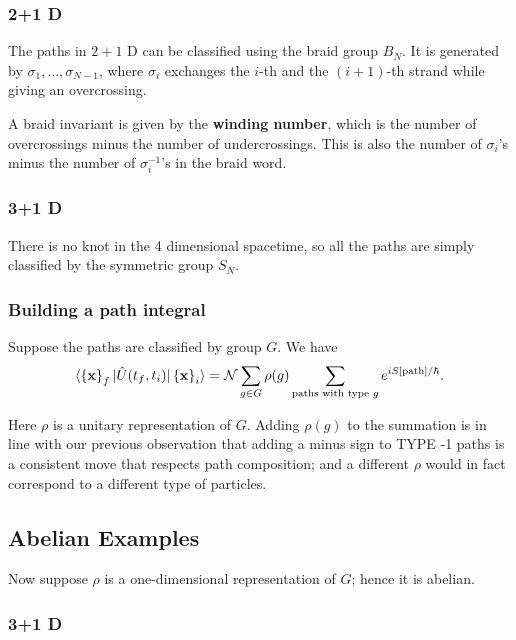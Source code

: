 \subsubsection{2+1 D}

The paths in $2+1$ D can be classified using the braid group $B_N$. It is generated by $\sigma_1, \ldots , \sigma_{N-1}$, where $\sigma_i$  exchanges the $i$-th and the $(i+1)$-th strand while giving an overcrossing. 


A braid invariant is given by the \textbf{winding number}, which is the number of overcrossings minus the number of undercrossings. This is also the number of $\sigma_i$'s minus the number of $\sigma_i ^{-1}$'s in the braid word.

\subsubsection{3+1 D}

There is no knot in the 4 dimensional spacetime, so all the paths are simply classified by the symmetric group $S_N$. 


\subsubsection{Building a path integral}

Suppose the paths are classified by group $G$. We have
 $$
\langle \left\{ \vb x \right\} _f  | \hat{U} (t_f , t_i) | \left\{ \vb x \right\} _i  \rangle = \mathcal{N} \sum_{g \in  G} \rho(g) \sum_{\text{paths with type } g} e^{i S[\text{path}] / \hbar}
.$$

Here $\rho$ is a unitary representation of $G$. Adding $\rho(g)$ to the summation  is in line with our previous observation that adding a minus sign to TYPE -1 paths is a consistent move that respects path composition; and a different $\rho$ would  in fact correspond to a different type of particles. 


\subsection{Abelian Examples}


Now suppose $\rho$ is a one-dimensional representation of $G$; hence it is abelian. 

\subsubsection{3+1 D}

